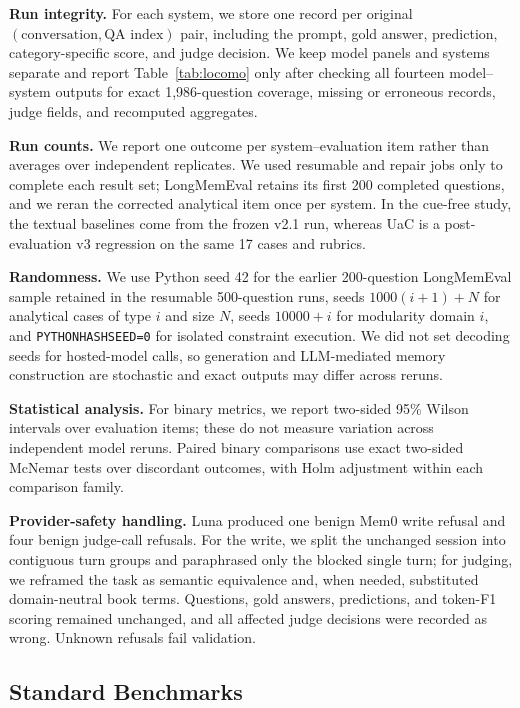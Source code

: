 \textbf{Run integrity.} For each system, we store one record per original $(\text{conversation},\text{QA index})$ pair, including the prompt, gold answer, prediction, category-specific score, and judge decision. We keep model panels and systems separate and report Table~\ref{tab:locomo} only after checking all fourteen model--system outputs for exact 1{,}986-question coverage, missing or erroneous records, judge fields, and recomputed aggregates.

\textbf{Run counts.} We report one outcome per system--evaluation item rather than averages over independent replicates. We used resumable and repair jobs only to complete each result set; LongMemEval retains its first 200 completed questions, and we reran the corrected analytical item once per system. In the cue-free study, the textual baselines come from the frozen v2.1 run, whereas UaC is a post-evaluation v3 regression on the same 17 cases and rubrics.

\textbf{Randomness.} We use Python seed 42 for the earlier 200-question LongMemEval sample retained in the resumable 500-question runs, seeds $1000(i+1)+N$ for analytical cases of type $i$ and size $N$, seeds $10000+i$ for modularity domain $i$, and \texttt{PYTHONHASHSEED=0} for isolated constraint execution. We did not set decoding seeds for hosted-model calls, so generation and LLM-mediated memory construction are stochastic and exact outputs may differ across reruns.

\textbf{Statistical analysis.} For binary metrics, we report two-sided 95\% Wilson intervals over evaluation items; these do not measure variation across independent model reruns. Paired binary comparisons use exact two-sided McNemar tests over discordant outcomes, with Holm adjustment within each comparison family.

\textbf{Provider-safety handling.} Luna produced one benign Mem0 write refusal and four benign judge-call refusals. For the write, we split the unchanged session into contiguous turn groups and paraphrased only the blocked single turn; for judging, we reframed the task as semantic equivalence and, when needed, substituted domain-neutral book terms. Questions, gold answers, predictions, and token-F1 scoring remained unchanged, and all affected judge decisions were recorded as wrong. Unknown refusals fail validation.

\subsection{Standard Benchmarks}

